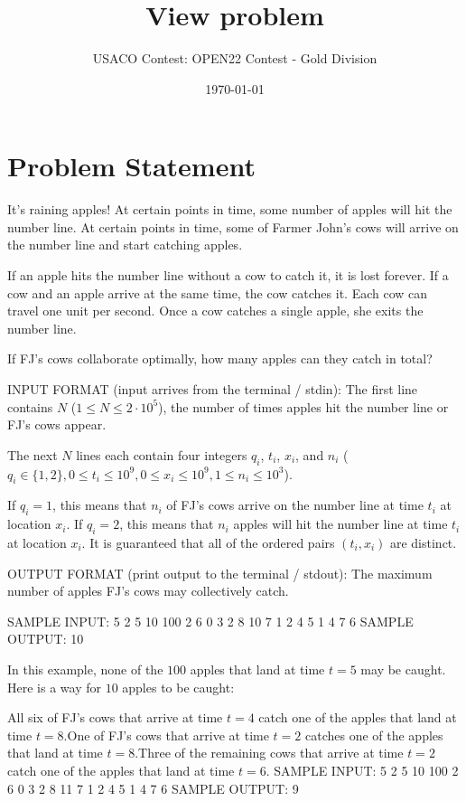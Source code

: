 \documentclass[12pt]{article}
\title{View problem}
\author{USACO Contest: OPEN22 Contest - Gold Division}
\date{\today}
\begin{document}
\maketitle

\section*{Problem Statement}

It's raining apples! At certain points in time, some number of apples will hit
the number line. At certain points in time, some of Farmer John's cows will
arrive on the number line and start catching apples. 

If an apple hits the number line without a cow to catch it, it is lost forever.
If a cow and an apple arrive at the same time, the cow catches it. Each cow can
travel one unit per second. Once a cow catches a single apple, she exits the
number line. 

If FJ's cows collaborate optimally, how many apples can they catch in total?

INPUT FORMAT (input arrives from the terminal / stdin):
The first line contains $N$ ($1\le N\le 2\cdot 10^5$), the number of times
apples hit the number line or FJ's cows appear.

The next $N$ lines each contain four integers $q_i$, $t_i$, $x_i$, and $n_i$
($q_i\in \{1,2\}, 0\le t_i\le 10^9, 0\le x_i\le 10^9, 1\le n_i\le 10^3$). 

 If $q_i=1$, this means that $n_i$ of FJ's cows arrive on the number line at
time $t_i$ at location $x_i$. If $q_i=2$, this means that $n_i$ apples will hit the number line at time
$t_i$ at location $x_i$. 
It is guaranteed that all of the ordered pairs $(t_i,x_i)$ are distinct.

OUTPUT FORMAT (print output to the terminal / stdout):
The maximum number of apples FJ's cows may collectively catch.

SAMPLE INPUT:
5
2 5 10 100
2 6 0 3
2 8 10 7
1 2 4 5
1 4 7 6
SAMPLE OUTPUT: 
10

In this example, none of the $100$ apples that land at time $t=5$ may be caught. Here is a way
for $10$ apples to be caught:

All six of FJ's cows that arrive at time $t=4$ catch one of the apples that
land at time $t=8$.One of FJ's cows that arrive at time $t=2$ catches one of the apples that
land at time $t=8$.Three of the remaining cows that arrive at time $t=2$ catch one of the
apples that land at time $t=6$.
SAMPLE INPUT:
5
2 5 10 100
2 6 0 3
2 8 11 7
1 2 4 5
1 4 7 6
SAMPLE OUTPUT: 
9
\end{document}
